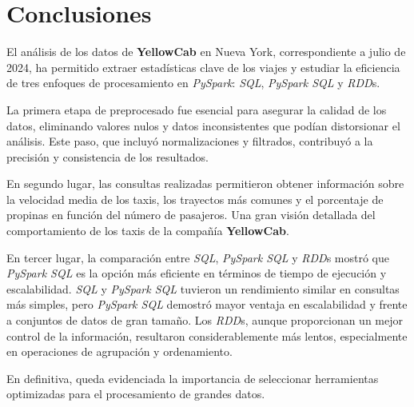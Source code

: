 \section{Conclusiones}
El análisis de los datos de \textbf{YellowCab} en Nueva York, correspondiente a julio de 2024, ha permitido extraer estadísticas clave de los viajes y estudiar la eficiencia de tres enfoques de procesamiento en \textit{PySpark}: \textit{SQL}, \textit{PySpark SQL} y \textit{RDD}s.

La primera etapa de preprocesado fue esencial para asegurar la calidad de los datos, eliminando valores nulos y datos inconsistentes que podían distorsionar el análisis. Este paso, que incluyó normalizaciones y filtrados, contribuyó a la precisión y consistencia de los resultados.

En segundo lugar, las consultas realizadas permitieron obtener información sobre la velocidad media de los taxis, los trayectos más comunes y el porcentaje de propinas en función del número de pasajeros. Una gran visión detallada del comportamiento de los taxis de la compañía \textbf{YellowCab}.

En tercer lugar, la comparación entre \textit{SQL}, \textit{PySpark SQL} y \textit{RDD}s mostró que \textit{PySpark SQL} es la opción más eficiente en términos de tiempo de ejecución y escalabilidad. \textit{SQL} y \textit{PySpark SQL} tuvieron un rendimiento similar en consultas más simples, pero \textit{PySpark SQL} demostró mayor ventaja en escalabilidad y frente a conjuntos de datos de gran tamaño. Los \textit{RDD}s, aunque proporcionan un mejor control de la información, resultaron considerablemente más lentos, especialmente en operaciones de agrupación y ordenamiento.

En definitiva, queda evidenciada la importancia de seleccionar herramientas optimizadas para el procesamiento de grandes datos.

